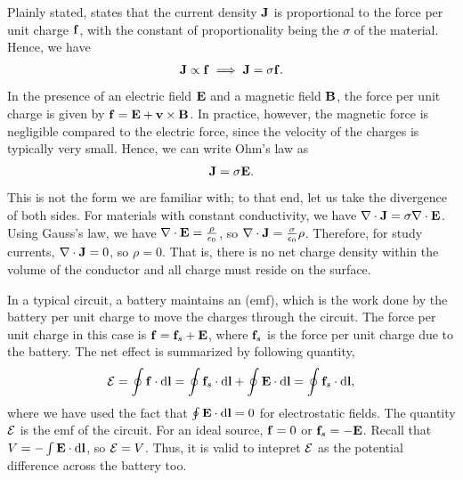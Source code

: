 Plainly stated,  states that the current density $\mathbf{J}$ is proportional to the force per unit charge $\mathbf{f}$, with the constant of proportionality being the  $\sigma$ of the material. Hence, we have
\begin{align}
    \mathbf{J} \propto \mathbf{f} \implies \mathbf{J} = \sigma \mathbf{f}.
\end{align}
In the presence of an electric field $\mathbf{E}$ and a magnetic field $\mathbf{B}$, the force per unit charge is given by $\mathbf{f} = \mathbf{E} + \mathbf{v} \times \mathbf{B}$. In practice, however, the magnetic force is negligible compared to the electric force, since the velocity of the charges is typically very small. Hence, we can write Ohm's law as
\begin{align}
    \mathbf{J} = \sigma \mathbf{E}.
\end{align}
This is not the form we are familiar with; to that end, let us take the divergence of both sides. For materials with constant conductivity, we have $\nabla \cdot \mathbf{J} = \sigma \nabla \cdot \mathbf{E}$. Using Gauss's law, we have $\nabla \cdot \mathbf{E} = \frac{\rho}{\epsilon_{0}}$, so $\nabla \cdot \mathbf{J} = \frac{\sigma}{\epsilon_{0}} \rho$. Therefore, for study currents, $\nabla \cdot \mathbf{J} = 0$, so $\rho = 0$. That is, there is no net charge density within the volume of the conductor and all charge must reside on the surface.

In a typical circuit, a battery maintains an  (emf), which is the work done by the battery per unit charge to move the charges through the circuit. The force per unit charge in this case is $\mathbf{f} = \mathbf{f}_{s} + \mathbf{E}$, where $\mathbf{f}_{s}$ is the force per unit charge due to the battery. The net effect is summarized by following quantity,
\begin{align}
    \mathcal{E} = \oint \mathbf{f} \cdot \mathrm{d}\mathbf{l} = \oint \mathbf{f}_{s} \cdot \mathrm{d}\mathbf{l} + \oint \mathbf{E} \cdot \mathrm{d}\mathbf{l} = \oint \mathbf{f}_{s} \cdot \mathrm{d}\mathbf{l},
\end{align}
where we have used the fact that $\oint \mathbf{E} \cdot \mathrm{d}\mathbf{l} = 0$ for electrostatic fields. The quantity $\mathcal{E}$ is the emf of the circuit. For an ideal source, $\mathbf{f} = 0$ or $\mathbf{f}_{s} = -\mathbf{E}$. Recall that $V = -\int \mathbf{E} \cdot \mathrm{d}\mathbf{l}$, so $\mathcal{E} = V$. Thus, it is valid to intepret $\mathcal{E}$ as the potential difference across the battery too.

